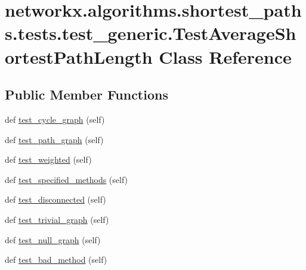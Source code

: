 \hypertarget{classnetworkx_1_1algorithms_1_1shortest__paths_1_1tests_1_1test__generic_1_1TestAverageShortestPathLength}{}\section{networkx.\+algorithms.\+shortest\+\_\+paths.\+tests.\+test\+\_\+generic.\+Test\+Average\+Shortest\+Path\+Length Class Reference}
\label{classnetworkx_1_1algorithms_1_1shortest__paths_1_1tests_1_1test__generic_1_1TestAverageShortestPathLength}
\subsection*{Public Member Functions}
\begin{DoxyCompactItemize}
\item 
def \hyperlink{classnetworkx_1_1algorithms_1_1shortest__paths_1_1tests_1_1test__generic_1_1TestAverageShortestPathLength_ad0c4b370ba040a5072f2bcdabb762d4f}{test\+\_\+cycle\+\_\+graph} (self)
\item 
def \hyperlink{classnetworkx_1_1algorithms_1_1shortest__paths_1_1tests_1_1test__generic_1_1TestAverageShortestPathLength_a788a4f8d1eeea554ea4c2b7dc6818b9a}{test\+\_\+path\+\_\+graph} (self)
\item 
def \hyperlink{classnetworkx_1_1algorithms_1_1shortest__paths_1_1tests_1_1test__generic_1_1TestAverageShortestPathLength_a8116439d5554592baa5ce07ebd7ce7b8}{test\+\_\+weighted} (self)
\item 
def \hyperlink{classnetworkx_1_1algorithms_1_1shortest__paths_1_1tests_1_1test__generic_1_1TestAverageShortestPathLength_af05da8f76a6de2b13327676b2173f589}{test\+\_\+specified\+\_\+methods} (self)
\item 
def \hyperlink{classnetworkx_1_1algorithms_1_1shortest__paths_1_1tests_1_1test__generic_1_1TestAverageShortestPathLength_a09671d9dcdb57097190b1644a63c4a23}{test\+\_\+disconnected} (self)
\item 
def \hyperlink{classnetworkx_1_1algorithms_1_1shortest__paths_1_1tests_1_1test__generic_1_1TestAverageShortestPathLength_a121589c7a2dcd55d067ec1b185a2fc0c}{test\+\_\+trivial\+\_\+graph} (self)
\item 
def \hyperlink{classnetworkx_1_1algorithms_1_1shortest__paths_1_1tests_1_1test__generic_1_1TestAverageShortestPathLength_a62dbc458eab178933a9027a77248be8f}{test\+\_\+null\+\_\+graph} (self)
\item 
def \hyperlink{classnetworkx_1_1algorithms_1_1shortest__paths_1_1tests_1_1test__generic_1_1TestAverageShortestPathLength_a4f4ef39a3a93f683cb0313aa857ff43c}{test\+\_\+bad\+\_\+method} (self)
\end{DoxyCompactItemize}


